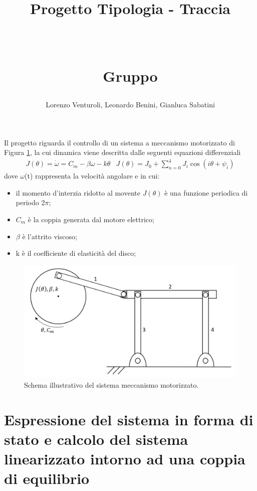\documentclass[a4paper, 11pt]{article}
\title{ \vspace{-1in}
		\huge \strut \coursename \strut 
		\\
		\Large  \strut Progetto Tipologia \tipology - Traccia \trace 
		\\
		\Large  \strut \projectname\strut
		\\
		\Large  \strut Gruppo \group\strut
		\vspace{-0.4cm}
}
\author{Lorenzo Venturoli, Leonardo Benini, Gianluca Sabatini}
\date{}
\begin{document}
\maketitle
\vspace{-0.5cm}

Il progetto riguarda il controllo di un sistema a meccanismo motorizzato di Figura \ref{fig:system_image}, la cui dinamica viene descritta dalle seguenti equazioni differenziali  
%
\begin{subequations}\label{eq:system}
\begin{align}
	J(\theta) = \dot{\omega} = C_m - \beta\omega - k\theta 
\end{align}
\begin{align}
	J(\theta) = J_0 + \sum_{n = 0}^{4}J_i\cos (i\theta +\psi_i)
\end{align}
\end{subequations}
%
dove $\omega$(t) rappresenta la velocità angolare e in cui:
\begin{itemize}
	\item il momento d'interzia ridotto al movente $J(\theta)$ è una funzione periodica di periodo 2$\pi$;
	\item $C_m$ è la coppia generata dal motore elettrico;
	\item $\beta$ è l'attrito viscoso;
	\item k è il coefficiente di elasticità del disco;
  \end{itemize}
%
\begin{figure}[h!]
	\centering
	\includegraphics[width=0.75\linewidth]{./images/system_image.png}
	\caption{Schema illustrativo del sistema meccanismo motorizzato.}
	\label{fig:system_image}
\end{figure}
\section{Espressione del sistema in forma di stato e calcolo del sistema linearizzato intorno ad una coppia di equilibrio}
\end{document}
